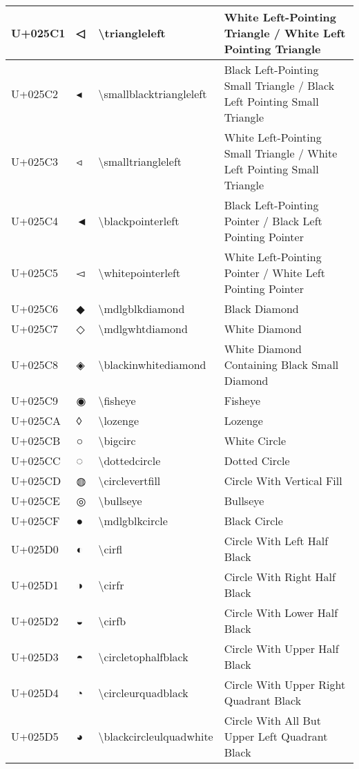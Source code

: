 \begin{table}[h]
\begin{tabulary}{\linewidth}{|L|L|L|L|}
\hline
U+025C1 & ◁ & {\textbackslash}triangleleft & White Left-Pointing Triangle / White Left Pointing Triangle \\
\hline
U+025C2 & ◂ & {\textbackslash}smallblacktriangleleft & Black Left-Pointing Small Triangle / Black Left Pointing Small Triangle \\
\hline
U+025C3 & ◃ & {\textbackslash}smalltriangleleft & White Left-Pointing Small Triangle / White Left Pointing Small Triangle \\
\hline
U+025C4 & ◄ & {\textbackslash}blackpointerleft & Black Left-Pointing Pointer / Black Left Pointing Pointer \\
\hline
U+025C5 & ◅ & {\textbackslash}whitepointerleft & White Left-Pointing Pointer / White Left Pointing Pointer \\
\hline
U+025C6 & ◆ & {\textbackslash}mdlgblkdiamond & Black Diamond \\
\hline
U+025C7 & ◇ & {\textbackslash}mdlgwhtdiamond & White Diamond \\
\hline
U+025C8 & ◈ & {\textbackslash}blackinwhitediamond & White Diamond Containing Black Small Diamond \\
\hline
U+025C9 & ◉ & {\textbackslash}fisheye & Fisheye \\
\hline
U+025CA & ◊ & {\textbackslash}lozenge & Lozenge \\
\hline
U+025CB & ○ & {\textbackslash}bigcirc & White Circle \\
\hline
U+025CC & ◌ & {\textbackslash}dottedcircle & Dotted Circle \\
\hline
U+025CD & ◍ & {\textbackslash}circlevertfill & Circle With Vertical Fill \\
\hline
U+025CE & ◎ & {\textbackslash}bullseye & Bullseye \\
\hline
U+025CF & ● & {\textbackslash}mdlgblkcircle & Black Circle \\
\hline
U+025D0 & ◐ & {\textbackslash}cirfl & Circle With Left Half Black \\
\hline
U+025D1 & ◑ & {\textbackslash}cirfr & Circle With Right Half Black \\
\hline
U+025D2 & ◒ & {\textbackslash}cirfb & Circle With Lower Half Black \\
\hline
U+025D3 & ◓ & {\textbackslash}circletophalfblack & Circle With Upper Half Black \\
\hline
U+025D4 & ◔ & {\textbackslash}circleurquadblack & Circle With Upper Right Quadrant Black \\
\hline
U+025D5 & ◕ & {\textbackslash}blackcircleulquadwhite & Circle With All But Upper Left Quadrant Black \\

\end{tabulary}
\end{table}

